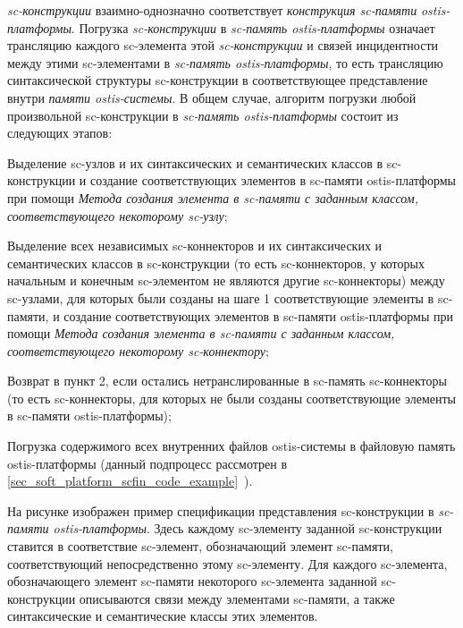  \textit{sc-конструкции} взаимно-однозначно соответствует \textit{конструкция sc-памяти} \textit{ostis-платформы}. Погрузка \textit{sc-конструкции} в \textit{sc-память ostis-платформы} означает трансляцию каждого sc-элемента этой \textit{sc-конструкции} и связей инцидентности между этими sc-элементами в \textit{sc-память ostis-платформы}, то есть трансляцию синтаксической структуры sc-конструкции в соответствующее представление внутри \textit{памяти ostis-системы}. В общем случае, алгоритм погрузки любой произвольной sc-конструкции в \textit{sc-память ostis-платформы} состоит из следующих этапов:
\begin{textitemize}
	\item Выделение sc-узлов и их синтаксических и семантических классов в sc-конструкции и создание соответствующих элементов в sc-памяти ostis-платформы при помощи \textit{Метода создания элемента в sc-памяти с заданным классом, соответствующего некоторому sc-узлу};
	\item Выделение всех независимых sc-коннекторов и их синтаксических и семантических классов в sc-конструкции (то есть sc-коннекторов, у которых начальным и конечным sc-элементом не являются другие sc-коннекторы) между sc-узлами, для которых были созданы на шаге 1 соответствующие элементы в sc-памяти, и создание соответствующих элементов в sc-памяти ostis-платформы при помощи \textit{Метода создания элемента в sc-памяти с заданным классом, соответствующего некоторому sc-коннектору};
	\item Возврат в пункт 2, если остались нетранслированные в sc-память sc-коннекторы (то есть sc-коннекторы, для которых не были созданы соответствующие элементы в sc-памяти ostis-платформы);
	\item Погрузка содержимого всех внутренних файлов ostis-системы в файловую память ostis-платформы (данный подпроцесс рассмотрен в \ref{sec_soft_platform_scfin_code_example}~).
\end{textitemize}

На рисунке  изображен пример спецификации представления sc-конструкции в \textit{sc-памяти ostis-платформы}. Здесь каждому sc-элементу заданной sc-конструкции ставится в соответствие sc-элемент, обозначающий элемент sc-памяти, соответствующий непосредственно этому sc-элементу. Для каждого sc-элемента, обозначающего элемент sc-памяти некоторого sc-элемента заданной sc-конструкции описываются связи между элементами sc-памяти, а также синтаксические и семантические классы этих элементов.

